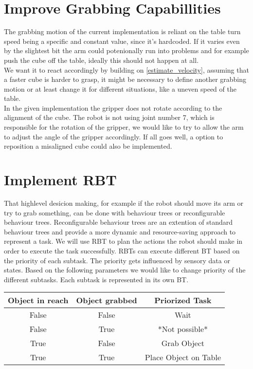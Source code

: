 \documentclass[report]{iisthesis}
\begin{document}
\section{Improve Grabbing Capabillities}
\label{improve_grabbing}
The grabbing motion of the current implementation is reliant on the table turn speed being a specific and constant value, since it's hardcoded. If it varies even by the slightest bit
the arm could potenionally run into problems and for example push the cube off the table, ideally this should not happen at all. \\
We want it to react accordingly by building on \ref{estimate_velocity}, assuming that a faster cube is harder to grasp, it might be necessary to define another grabbing motion 
or at least change it for different situations, like a uneven speed of the table. \\
In the given implementation the gripper does not rotate according to the alignment of the cube. The robot is not using joint number 7, which is responsible for the rotation of the gripper, we would like to try to allow the arm to adjust the angle of the gripper accordingly.
If all goes well, a option to reposition a misaligned cube could also be implemented.

\section{Implement RBT}
\label{implement_rbt}
That highlevel desicion making, for example if the robot should move its arm or try to grab something, can be done with behaviour trees or reconfigurable behaviour trees.
Reconfigurable behaviour trees are an extention of standard behaviour trees and provide a more dynamic and resource-saving approach to represent a task.
We will use RBT to plan the actions the robot should make in order to execute the task successfully. RBTs can execute different BT based on the priority of each subtask. The priority gets influenced by sensory data or states.
Based on the following parameters we would like to change priority of the different subtasks. Each subtask is represented in its own BT.
\begin{center}
    \begin{tabular}{ |c|c||c|  }
        \hline
        Object in reach & Object grabbed & Priorized Task \\
        \hline
        \hline
        False & False & Wait \\
        False & True & *Not possible* \\
        True & False & Grab Object \\ 
        True & True & Place Object on Table \\
        \hline
    \end{tabular}
\end{center}
\end{document}
